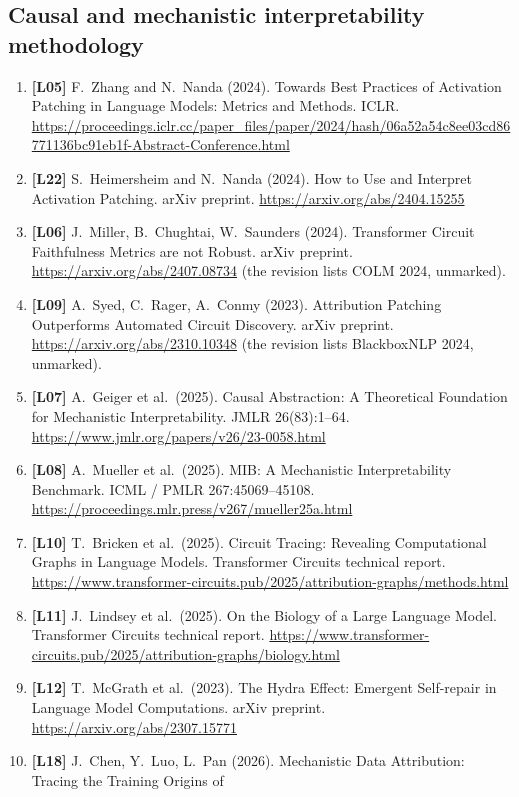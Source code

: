 \documentclass[10pt,a4paper]{article}
\begin{document}
{\subsection*{Causal and mechanistic interpretability methodology}
\begin{enumerate}[label={},leftmargin=0pt]
\item \textbf{[L05]} F.~Zhang and N.~Nanda (2024). Towards Best Practices of Activation Patching in Language
Models: Metrics and Methods. ICLR.
\url{https://proceedings.iclr.cc/paper_files/paper/2024/hash/06a52a54c8ee03cd86771136bc91eb1f-Abstract-Conference.html}
\item \textbf{[L22]} S.~Heimersheim and N.~Nanda (2024). How to Use and Interpret Activation Patching. arXiv
preprint. \url{https://arxiv.org/abs/2404.15255}
\item \textbf{[L06]} J.~Miller, B.~Chughtai, W.~Saunders (2024). Transformer Circuit Faithfulness Metrics are not
Robust. arXiv preprint. \url{https://arxiv.org/abs/2407.08734} (the revision lists COLM 2024, unmarked).
\item \textbf{[L09]} A.~Syed, C.~Rager, A.~Conmy (2023). Attribution Patching Outperforms Automated Circuit
Discovery. arXiv preprint. \url{https://arxiv.org/abs/2310.10348} (the revision lists BlackboxNLP 2024,
unmarked).
\item \textbf{[L07]} A.~Geiger et al.\ (2025). Causal Abstraction: A Theoretical Foundation for Mechanistic
Interpretability. JMLR 26(83):1--64. \url{https://www.jmlr.org/papers/v26/23-0058.html}
\item \textbf{[L08]} A.~Mueller et al.\ (2025). MIB: A Mechanistic Interpretability Benchmark. ICML / PMLR
267:45069--45108. \url{https://proceedings.mlr.press/v267/mueller25a.html}
\item \textbf{[L10]} T.~Bricken et al.\ (2025). Circuit Tracing: Revealing Computational Graphs in Language Models.
Transformer Circuits technical report.
\url{https://www.transformer-circuits.pub/2025/attribution-graphs/methods.html}
\item \textbf{[L11]} J.~Lindsey et al.\ (2025). On the Biology of a Large Language Model. Transformer Circuits
technical report. \url{https://www.transformer-circuits.pub/2025/attribution-graphs/biology.html}
\item \textbf{[L12]} T.~McGrath et al.\ (2023). The Hydra Effect: Emergent Self-repair in Language Model
Computations. arXiv preprint. \url{https://arxiv.org/abs/2307.15771}
\item \textbf{[L18]} J.~Chen, Y.~Luo, L.~Pan (2026). Mechanistic Data Attribution: Tracing the Training Origins of

\end{enumerate}}
\end{document}
